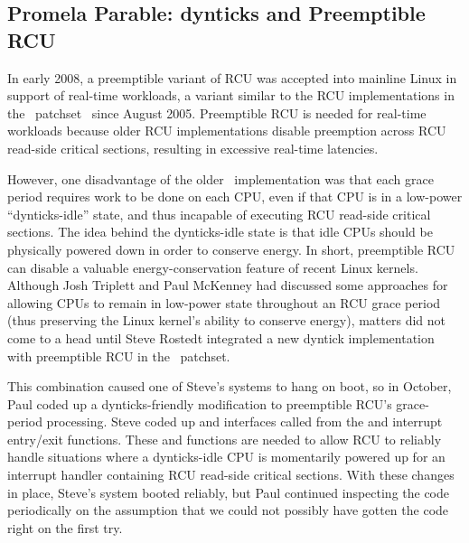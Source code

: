 

\subsection{Promela Parable: dynticks and Preemptible RCU}
\label{sec:formal:Promela Parable: dynticks and Preemptible RCU}

In early 2008, a preemptible variant of RCU was accepted into
mainline Linux in support of real-time workloads,
a variant similar to the RCU implementations in
the \rt\ patchset~\cite{IngoMolnar05a}
since August 2005.
Preemptible RCU is needed for real-time workloads because older
RCU implementations disable preemption across RCU read-side
critical sections, resulting in excessive real-time latencies.

However, one disadvantage of the older \rt\ implementation
was that each grace period
requires work to be done on each CPU, even if that CPU is in a low-power
``dynticks-idle'' state,
and thus incapable of executing RCU read-side critical sections.
The idea behind the dynticks-idle state is that idle CPUs
should be physically powered down in order to conserve energy.
In short, preemptible RCU can disable a valuable energy-conservation
feature of recent Linux kernels.
Although Josh Triplett and Paul McKenney
had discussed some approaches for allowing
CPUs to remain in low-power state throughout an RCU grace period
(thus preserving the Linux kernel's ability to conserve energy), matters
did not come to a head until Steve Rostedt integrated a new dyntick
implementation with preemptible RCU in the \rt\ patchset.

This combination caused one of Steve's systems to hang on boot, so in
October, Paul coded up a dynticks-friendly modification to preemptible RCU's
grace-period processing.
Steve coded up  and 
interfaces called from the
 and  interrupt
entry/exit functions.
These  and 
functions are needed to allow RCU to reliably handle situations where
a dynticks-idle CPU is momentarily powered up for an interrupt
handler containing RCU read-side critical sections.
With these changes in place, Steve's system booted reliably,
but Paul continued inspecting the code periodically on the assumption
that we could not possibly have gotten the code right on the first try.

